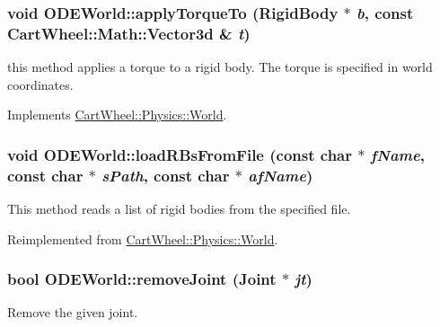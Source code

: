 \hypertarget{classCartWheel_1_1Physics_1_1ODEWorld_a99608efa452523e74cc61cd7cbafb496}{
\subsubsection[{applyTorqueTo}]{\setlength{\rightskip}{0pt plus 5cm}void ODEWorld::applyTorqueTo ({\bf RigidBody} $\ast$ {\em b}, \/  const {\bf CartWheel::Math::Vector3d} \& {\em t})}}
\label{classCartWheel_1_1Physics_1_1ODEWorld_a99608efa452523e74cc61cd7cbafb496}
this method applies a torque to a rigid body. The torque is specified in world coordinates. 

Implements \hyperlink{classCartWheel_1_1Physics_1_1World_ae4f6992b0360ac2599a8980621cde06f}{CartWheel::Physics::World}.

\hypertarget{classCartWheel_1_1Physics_1_1ODEWorld_aecf3cd605875b12cdc25edd660ab3085}{
\subsubsection[{loadRBsFromFile}]{\setlength{\rightskip}{0pt plus 5cm}void ODEWorld::loadRBsFromFile (const char $\ast$ {\em fName}, \/  const char $\ast$ {\em sPath}, \/  const char $\ast$ {\em afName})}}
\label{classCartWheel_1_1Physics_1_1ODEWorld_aecf3cd605875b12cdc25edd660ab3085}
This method reads a list of rigid bodies from the specified file. 

Reimplemented from \hyperlink{classCartWheel_1_1Physics_1_1World_a0602db984b22bbc3d13162a9ec07eb73}{CartWheel::Physics::World}.

\hypertarget{classCartWheel_1_1Physics_1_1ODEWorld_a49a6eb9fccf6d96fb57ea626431ce7a4}{
\subsubsection[{removeJoint}]{\setlength{\rightskip}{0pt plus 5cm}bool ODEWorld::removeJoint ({\bf Joint} $\ast$ {\em jt})}}
\label{classCartWheel_1_1Physics_1_1ODEWorld_a49a6eb9fccf6d96fb57ea626431ce7a4}
Remove the given joint. 

